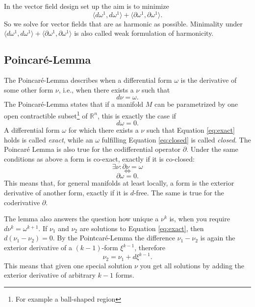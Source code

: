 In the vector field design set up the aim is to minimize
$$\langle d\omega^1,d\omega^1\rangle + \langle \partial\omega^1,\partial\omega^1\rangle.$$
So we solve for vector fields that are as harmonic as possible. Minimality under $\langle d\omega^1,d\omega^1\rangle + \langle \partial\omega^1,\partial\omega^1\rangle$ is also called weak formulation of harmonicity.

\subsection{Poincar\'e-Lemma}
\label{ssec:vf_poincare}
The Poincar\'e-Lemma describes when a differential form $\omega$ is the derivative of some other form $\nu$, i.e., when there exists a $\nu$ such that
\begin{equation} d\nu = \omega .\label{eq:exact}\end{equation}
The Poincar\'e-Lemma states that if a manifold $M$ can be parametrized by one open contractible subset\footnote{For example a ball-shaped region} of $\mathbb R^n$, this is exactly the case if
\begin{equation} d\omega = 0 \label{eq:closed}.\end{equation}
A differential form $\omega$ for which there exists a $\nu$ such that Equation \ref{eq:exact} holds is called \emph{exact}, while an $\omega$ fulfilling Equation \ref{eq:closed} is called \emph{closed}. The Poincar\'e Lemma is also true for the codifferential operator $\partial$. Under the same conditions as above a form is co-exact, exactly if it is co-closed:
\[\exists \nu : \partial \nu = \omega\] \[\Leftrightarrow\]\[ \partial \omega = 0.\]
This means that, for general manifolds at least locally, a form is the exterior derivative of another form, exactly if it is $d$-free. The same is true for the coderivative $\partial$. 


The lemma also answers the question how unique a $\nu^{k}$ is, when you require $d\nu^{k} = \omega^{k+1}$. If $\nu_1$ and $\nu_2$ are solutions to Equation \ref{eq:exact}, then $d(\nu_1-\nu_2) = 0$. By the Pointcar\'e-Lemma the difference $ \nu_1 - \nu_2$ is again the exterior derivative of a $(k-1)$-form $\xi^{k-1}$, therefore 
\[\nu_2 = \nu_1 +  d\xi^{k-1}.\]
This means that given one special solution $\nu$ you get all solutions by adding the exterior derivative of arbitrary $k-1$ forms.

